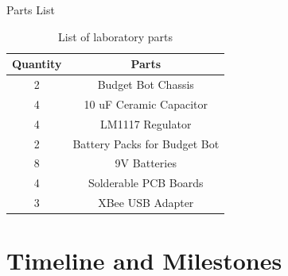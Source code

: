\documentclass{beamer}
\begin{document}

\begin{frame}{Parts List}

  \begin{table}[h!]
      \centering
      \begin{tabular}{c|c}
          \toprule
          \textbf{Quantity} & \textbf{Parts}\\
          \toprule
          2 & Budget Bot Chassis\\
          4 & 10 uF Ceramic Capacitor\\
          4 & LM1117 Regulator\\
          2 & Battery Packs for Budget Bot\\
          8 & 9V Batteries\\
          4 & Solderable PCB Boards\\
          3 & XBee USB Adapter\\
          \bottomrule
      \end{tabular}
      \caption{List of laboratory parts}
      \label{tab:Partslablist}
  \end{table}

\end{frame}


\section{Timeline and Milestones}
\end{document}
